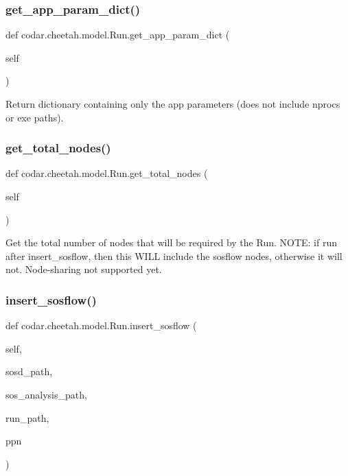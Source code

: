 \subsubsection{\texorpdfstring{get\+\_\+app\+\_\+param\+\_\+dict()}{get\_app\_param\_dict()}}
{\footnotesize\ttfamily def codar.\+cheetah.\+model.\+Run.\+get\+\_\+app\+\_\+param\+\_\+dict (\begin{DoxyParamCaption}\item[{}]{self }\end{DoxyParamCaption})}

\begin{DoxyVerb}Return dictionary containing only the app parameters
(does not include nprocs or exe paths).\end{DoxyVerb}
 \mbox{\label{classcodar_1_1cheetah_1_1model_1_1_run_ac75c0038a278def4dce9aaf37fbe1c70}} 
\subsubsection{\texorpdfstring{get\+\_\+total\+\_\+nodes()}{get\_total\_nodes()}}
{\footnotesize\ttfamily def codar.\+cheetah.\+model.\+Run.\+get\+\_\+total\+\_\+nodes (\begin{DoxyParamCaption}\item[{}]{self }\end{DoxyParamCaption})}

\begin{DoxyVerb}Get the total number of nodes that will be required by the Run.
NOTE: if run after insert_sosflow, then this WILL include the sosflow
nodes, otherwise it will not. Node-sharing not supported yet.\end{DoxyVerb}
 \mbox{\label{classcodar_1_1cheetah_1_1model_1_1_run_a8f4284bf79f8b909c4c2d0ef5319e3bc}} 
\subsubsection{\texorpdfstring{insert\+\_\+sosflow()}{insert\_sosflow()}}
{\footnotesize\ttfamily def codar.\+cheetah.\+model.\+Run.\+insert\+\_\+sosflow (\begin{DoxyParamCaption}\item[{}]{self,  }\item[{}]{sosd\+\_\+path,  }\item[{}]{sos\+\_\+analysis\+\_\+path,  }\item[{}]{run\+\_\+path,  }\item[{}]{ppn }\end{DoxyParamCaption})}

